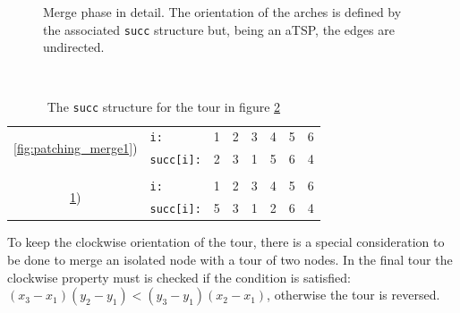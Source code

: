 \begin{figure}[!h]
\begin{subfigure}{.26\columnwidth}
		\caption{}
		\label{fig:patching_merge3}
	\end{subfigure}

	\caption{Merge phase in detail. The orientation of the arches is defined by the associated \texttt{succ} structure but, being an aTSP, the edges are undirected.}
	\label{fig:patching_merge}
\end{figure}\\

\begin{table}[h]
	\centering
	\caption{The \texttt{succ} structure for the tour in figure \ref{fig:patching_merge}}
	\begin{tabular}{clcccccc}
		\multirow{2}{*}{\ref{fig:patching_merge1})} 	& \texttt{i:}		& 1 & 2 & 3 & 4 & 5 & 6 \\
														& \texttt{succ[i]:}	& 2 & 3 & 1 & 5 & 6 & 4 \\
														&		   			&   &   &   &   &   &   \\
		\multirow{2}{*}{\ref{fig:patching_merge3})} 	& \texttt{i:}		& 1 & 2 & 3 & 4 & 5 & 6 \\
														& \texttt{succ[i]:}	& 5 & 3 & 1 & 2 & 6 & 4 \\
	\end{tabular}
\end{table}
To keep the clockwise orientation of the tour, there is a special consideration to be done to merge an isolated node with a tour of two nodes. In the final tour the clockwise property must is checked if the condition is satisfied:
$ (x_3 - x_1)(y_2 - y_1) < (y_3 - y_1)(x_2 - x_1) $,
otherwise the tour is reversed.
